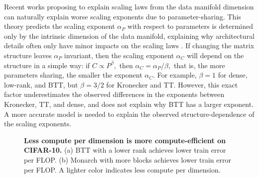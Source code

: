 \documentclass{article}
\theoremstyle{plain}
\theoremstyle{definition}
\theoremstyle{remark}
\begin{document}
Recent works proposing to explain scaling laws from the data manifold dimension \citep{bahri2021explaining, sharma2022scaling} can naturally explain worse scaling exponents due to parameter-sharing. This theory predicts the scaling exponent $\alpha_P$ with respect to parameters is determined only by the intrinsic dimension of the data manifold, explaining why architectural details often only have minor impacts on the scaling laws \citep{kaplan2020scaling}. If changing the matrix structure leaves $\alpha_P$ invariant, then the scaling exponent $\alpha_C$ will depend on the structure in a simple way: if $C \propto P^\beta,$ then $\alpha_C = \alpha_P/\beta,$ that is, the more parameters sharing, the smaller the exponent $\alpha_C$. For example, $\beta = 1$ for dense, low-rank, and BTT, but $\beta = 3/2$ for Kronecker and TT. However, this exact factor underestimates the observed differences in the exponents between Kronecker, TT, and dense, and does not explain why BTT has a larger exponent. 
A more accurate model is needed to explain the observed structure-dependence of the scaling exponents.

\begin{figure}[!t]
\centering
   \caption{ \textbf{Less compute per dimension is more compute-efficient on CIFAR-10.}
   (a) BTT with a lower rank achieves lower train error per FLOP.
   (b) Monarch with more blocks achieves lower train error per FLOP. A lighter color indicates less compute per dimension. 
   }
    \label{fig:compute_per_dim}
    \vspace{-4mm}
\end{figure}
\end{document}
